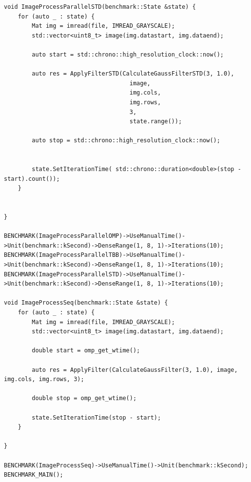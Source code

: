 \documentclass{report}
\begin{document}
\begin{lstlisting}[breaklines=true]
void ImageProcessParallelSTD(benchmark::State &state) {
    for (auto _ : state) {
        Mat img = imread(file, IMREAD_GRAYSCALE);
        std::vector<uint8_t> image(img.datastart, img.dataend);

        auto start = std::chrono::high_resolution_clock::now();

        auto res = ApplyFilterSTD(CalculateGaussFilterSTD(3, 1.0),
                                    image,
                                    img.cols,
                                    img.rows,
                                    3,
                                    state.range());

        auto stop = std::chrono::high_resolution_clock::now();


        state.SetIterationTime( std::chrono::duration<double>(stop - start).count());
    }


}

BENCHMARK(ImageProcessParallelOMP)->UseManualTime()->Unit(benchmark::kSecond)->DenseRange(1, 8, 1)->Iterations(10);
BENCHMARK(ImageProcessParallelTBB)->UseManualTime()->Unit(benchmark::kSecond)->DenseRange(1, 8, 1)->Iterations(10);
BENCHMARK(ImageProcessParallelSTD)->UseManualTime()->Unit(benchmark::kSecond)->DenseRange(1, 8, 1)->Iterations(10);

void ImageProcessSeq(benchmark::State &state) {
    for (auto _ : state) {
        Mat img = imread(file, IMREAD_GRAYSCALE);
        std::vector<uint8_t> image(img.datastart, img.dataend);

        double start = omp_get_wtime();

        auto res = ApplyFilter(CalculateGaussFilter(3, 1.0), image, img.cols, img.rows, 3);

        double stop = omp_get_wtime();

        state.SetIterationTime(stop - start);
    }

}

BENCHMARK(ImageProcessSeq)->UseManualTime()->Unit(benchmark::kSecond);
BENCHMARK_MAIN();

\end{lstlisting}
\end{document}
